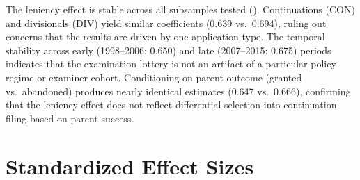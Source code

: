 \documentclass[12pt]{article}
\begin{document}
The leniency effect is stable across all subsamples tested (). Continuations (CON) and divisionals (DIV) yield similar coefficients (0.639 vs.\ 0.694), ruling out concerns that the results are driven by one application type. The temporal stability across early (1998--2006: 0.650) and late (2007--2015: 0.675) periods indicates that the examination lottery is not an artifact of a particular policy regime or examiner cohort. Conditioning on parent outcome (granted vs.\ abandoned) produces nearly identical estimates (0.647 vs.\ 0.666), confirming that the leniency effect does not reflect differential selection into continuation filing based on parent success.


\section{Standardized Effect Sizes}
\label{sec:sde}


\end{document}
